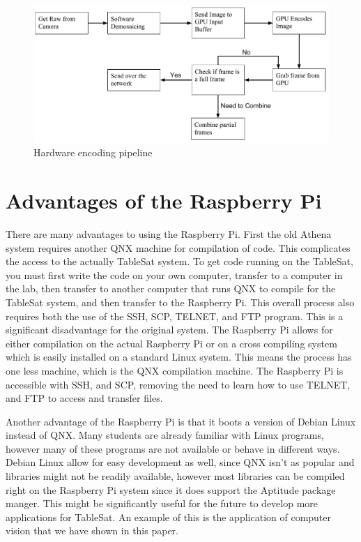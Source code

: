 \documentclass[conference, onecolumn, 12pt]{IEEEtran}
\begin{document}
\begin{figure}
\centering
\includegraphics[width=6.5in]{GPU_encoding.pdf}
\caption{Hardware encoding pipeline}
\end{figure}

\section{Advantages of the Raspberry Pi}
There are many advantages to using the Raspberry Pi. First the old Athena system requires another QNX machine for compilation of code. This complicates the access to the actually TableSat system. To get code running on the TableSat, you must first write the code on your own computer, transfer to a computer in the lab, then transfer to another computer that runs QNX to compile for the TableSat system, and then transfer to the Raspberry Pi. This overall process also requires both the use of the SSH, SCP, TELNET, and FTP program. This is a significant disadvantage for the original system. The Raspberry Pi allows for either compilation on the actual Raspberry Pi or on a cross compiling system which is easily installed on a standard Linux system. This means the process has one less machine, which is the QNX compilation machine. The Raspberry Pi is accessible with SSH, and SCP, removing the need to learn how to use TELNET, and FTP to access and transfer files.

Another advantage of the Raspberry Pi is that it boots a version of Debian Linux instead of QNX. Many students are already familiar with Linux programs, however many of these programs are not available or behave in different ways. Debian Linux allow for easy development as well, since QNX isn't as popular and libraries might not be readily available, however most libraries can be compiled right on the Raspberry Pi system since it does support the Aptitude package manger. This might be significantly useful for the future to develop more applications for TableSat. An example of this is the application of computer vision that we have shown in this paper.
\end{document}
